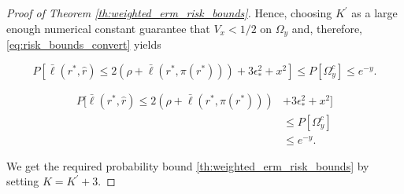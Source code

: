 \documentclass[letterpaper]{article} %
\def\DoubleColumn{}
\def\DoubleColumnEnd{}
\def\SingleColumn{}
\def\SingleColumnEnd{}
\newcommand{\Pro}{P}
\newcommand{\relossf}{\bar{\ell}}
\begin{document}
\begin{proof}[Proof of Theorem \ref{th:weighted_erm_risk_bounds}]
    Hence, choosing $K^\prime$ as a large enough numerical constant guarantee that $V_x < 1/2$ on $\Omega_y$ and, therefore, \eqref{eq:risk_bounds_convert} yields
    \SingleColumn
    \begin{equation}
        \label{eq:risk_bounds_convert}
        \Pro[\relossf(r^*,\hat{r})\le 2(\rho+\relossf(r^*,\pi(r^*)))+3\epsilon_*^2+x^2]\le \Pro[\Omega_y^c]\le e^{-y}.
    \end{equation}
    \SingleColumnEnd
    \DoubleColumn
        \begin{align*}
            \label{eq:risk_bounds_convert}
            \Pro[\relossf(r^*,\hat{r})\le 2(\rho+\relossf(r^*,\pi(r^*)))&+3\epsilon_*^2+x^2]\\
            &\le \Pro[\Omega_y^c]\\
            &\le e^{-y}.
        \end{align*}
    \DoubleColumnEnd
    We get the required probability bound \eqref{th:weighted_erm_risk_bounds} by setting $K=K^\prime+3$.
\end{proof}
\end{document}
